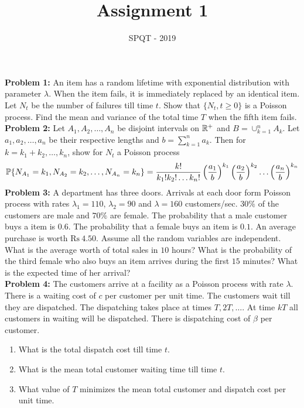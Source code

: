 \documentclass[a4paper,10pt,english]{article}
\title{Assignment 1}
\author{SPQT - 2019}
\begin{document}
\maketitle
\textbf{Problem 1:} An item has a random lifetime with exponential distribution with parameter $\lambda$. When the item fails, it is immediately replaced by an identical item. Let $N_t$ be the number of failures till time $t$. Show that $\{N_t, t \geq 0\}$ is a Poisson process. Find the mean and variance of the total time $T$ when the fifth item fails. \\
\indent \textbf{Problem 2:} Let $A_1, A_2, \ldots, A_n$ be disjoint intervals on $\R^+$ and $B = \cup_{k=1}^n A_k$. Let $a_1,a_2,\ldots,a_n$ be their respective lengths and $b = \sum_{k=1}^n a_k$. Then for $k = k_1+k_2,\ldots,k_n$, show for $N_t$ a Poisson process
\begin{align*}
\P\{N_{A_1}=k_1,N_{A_2}=k_2,\ldots,N_{A_n}=k_n\} = \frac{k!}{k_1!k_2!\ldots k_n!}\left(\frac{a_1}{b}\right)^{k_1}\left(\frac{a_2}{b}\right)^{k_2}\ldots\left(\frac{a_n}{b}\right)^{k_n}
\end{align*}
\indent \textbf{Problem 3:} A department has three doors. Arrivals at each door form Poisson process with rates $\lambda_1 = 110$, $\lambda_2 = 90$ and $\lambda = 160$ customers/sec. $30\%$ of the customers are male and $70\%$ are female. The probability that a male customer buys a item is $0.6$. The probability that a female buys an item is $0.1$. An average purchase is worth $\mathrm{Rs}\ 4.50$. Assume all the random variables are independent. What is the average worth of total sales in $10$ hours? What is the probability of the third female who also buys an item arrives during the first $15$ minutes? What is the expected time of her arrival?\\
\indent \textbf{Problem 4:} The customers arrive at a facility as a Poisson process with rate $\lambda$. There is a waiting cost of $c$ per customer per unit time. The customers wait till they are dispatched. The dispatching takes place at times $T,2T,\ldots$. At time $kT$ all customers in waiting will be dispatched. There is dispatching cost of $\beta$ per customer. 
\begin{enumerate}
\item What is the total dispatch cost till time $t$.
\item What is the mean total customer waiting time till time $t$.
\item What value of $T$ minimizes the mean total customer and dispatch cost per unit time. 
\end{enumerate}
\end{document}

